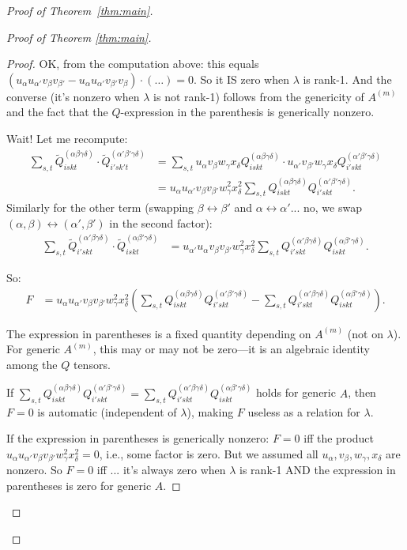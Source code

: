 \documentclass[12pt]{article}
\theoremstyle{definition}
\begin{document}
\begin{proof}[Proof of Theorem~\ref{thm:main}]
\begin{proof}[Proof of Theorem \ref{thm:main}]
\begin{proof}
OK, from the computation above: this equals $(u_\alpha u_{\alpha'}v_\beta v_{\beta'} - u_\alpha u_{\alpha'}v_{\beta'}v_\beta)\cdot(\ldots) = 0$. So it IS zero when $\lambda$ is rank-1. And the converse (it's nonzero when $\lambda$ is not rank-1) follows from the genericity of $A^{(m)}$ and the fact that the $Q$-expression in the parenthesis is generically nonzero.

Wait! Let me recompute:
\begin{align*}
\sum_{s,t}\tilde{Q}^{(\alpha\beta\gamma\delta)}_{iskt}\cdot\tilde{Q}^{(\alpha'\beta'\gamma\delta)}_{i'sk't} &= \sum_{s,t} u_\alpha v_\beta w_\gamma x_\delta Q^{(\alpha\beta\gamma\delta)}_{iskt}\cdot u_{\alpha'}v_{\beta'}w_\gamma x_\delta Q^{(\alpha'\beta'\gamma\delta)}_{i'skt}\\
&= u_\alpha u_{\alpha'}v_\beta v_{\beta'}w_\gamma^2 x_\delta^2\sum_{s,t}Q^{(\alpha\beta\gamma\delta)}_{iskt}Q^{(\alpha'\beta'\gamma\delta)}_{i'skt}.
\end{align*}
Similarly for the other term (swapping $\beta\leftrightarrow\beta'$ and $\alpha\leftrightarrow\alpha'$... no, we swap $(\alpha,\beta)\leftrightarrow(\alpha',\beta')$ in the second factor):
\begin{align*}
\sum_{s,t}\tilde{Q}^{(\alpha'\beta\gamma\delta)}_{i'skt}\cdot\tilde{Q}^{(\alpha\beta'\gamma\delta)}_{iskt} &= u_{\alpha'}u_\alpha v_\beta v_{\beta'}w_\gamma^2 x_\delta^2\sum_{s,t}Q^{(\alpha'\beta\gamma\delta)}_{i'skt}Q^{(\alpha\beta'\gamma\delta)}_{iskt}.
\end{align*}

So:
\begin{align*}
F &= u_\alpha u_{\alpha'}v_\beta v_{\beta'}w_\gamma^2 x_\delta^2\left(\sum_{s,t}Q^{(\alpha\beta\gamma\delta)}_{iskt}Q^{(\alpha'\beta'\gamma\delta)}_{i'skt} - \sum_{s,t}Q^{(\alpha'\beta\gamma\delta)}_{i'skt}Q^{(\alpha\beta'\gamma\delta)}_{iskt}\right).
\end{align*}

The expression in parentheses is a fixed quantity depending on $A^{(m)}$ (not on $\lambda$). For generic $A^{(m)}$, this may or may not be zero—it is an algebraic identity among the $Q$ tensors.

If $\sum_{s,t}Q^{(\alpha\beta\gamma\delta)}_{iskt}Q^{(\alpha'\beta'\gamma\delta)}_{i'skt} = \sum_{s,t}Q^{(\alpha'\beta\gamma\delta)}_{i'skt}Q^{(\alpha\beta'\gamma\delta)}_{iskt}$ holds for generic $A$, then $F = 0$ is automatic (independent of $\lambda$), making $F$ useless as a relation for $\lambda$.

If the expression in parentheses is generically nonzero: $F = 0$ iff the product $u_\alpha u_{\alpha'}v_\beta v_{\beta'}w_\gamma^2 x_\delta^2 = 0$, i.e., some factor is zero. But we assumed all $u_\alpha,v_\beta,w_\gamma,x_\delta$ are nonzero. So $F = 0$ iff ... it's always zero when $\lambda$ is rank-1 AND the expression in parentheses is zero for generic $A$.


\end{proof}
\end{proof}
\end{proof}
\end{document}
